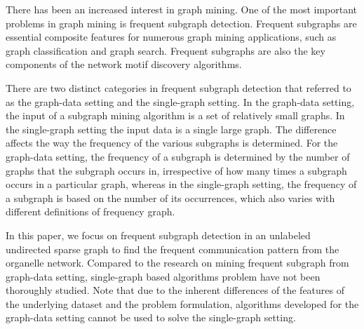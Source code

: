 \documentclass[9pt,oneside]{article}
\begin{document}
There has been an increased interest in graph mining. One of the most important problems in graph mining is frequent subgraph detection.
%
%
Frequent subgraphs are essential composite features for numerous graph mining applications, such as graph
classification\cite{fei2008structure, jin2009graph} and graph search\cite{zhou2004structured}.
%
Frequent subgraphs are also the key components of the network motif discovery
algorithms\cite{JinChen2006,milo2002network,kashani2009kavosh,wernicke2006fanmod, kashtan2004efficient,grochow2007network, alon2008biomolecular}.

There are two distinct categories in frequent subgraph detection that referred to as the graph-data setting and the single-graph setting. In the graph-data setting, the input of a subgraph mining algorithm is a set of relatively small graphs. In the single-graph setting the input data is a single large graph. The difference affects the way the frequency of the various subgraphs is determined. For the graph-data setting, the frequency of a subgraph is determined by the number of graphs that the subgraph occurs in, irrespective of how many times a subgraph occurs in a particular graph, whereas in the single-graph setting, the frequency of a subgraph is based on the number of its occurrences, which also varies with different definitions of frequency graph. %

 In this paper, we focus on frequent subgraph detection in an unlabeled undirected sparse graph to find the frequent communication pattern from the organelle network. Compared to the research on mining frequent subgraph from graph-data setting, single-graph based algorithms problem have not been thoroughly studied\cite{chen2007gapprox}. Note that due to the inherent differences of the features of the underlying dataset and the problem formulation, algorithms developed for the graph-data setting\cite{inokuchi2000apriori, FSG,huan2003efficient,gScan2002,ZhaonianZou2010} cannot be used to solve the single-graph setting\cite{kuramochi2005finding,zou2010frequent}.
\end{document}
